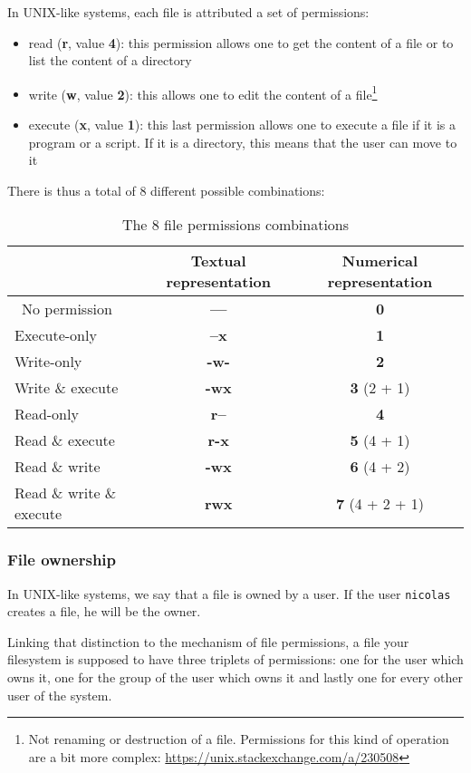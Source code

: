 \documentclass[12pt]{article}
\begin{document}
In UNIX-like systems, each file is attributed a set of permissions:
\begin{itemize}
	\item read (\textbf{r}, value \textbf{4}): this permission allows one to get the content of a file or to list the content of a directory
	\item write (\textbf{w}, value \textbf{2}): this allows one to edit the content of a file\footnote{Not renaming or destruction of a file. Permissions for this kind of operation are a bit more complex: \url{https://unix.stackexchange.com/a/230508}}
	\item execute (\textbf{x}, value \textbf{1}): this last permission allows one to execute a file if it is a program or a script. If it is a directory, this means that the user can move to it
\end{itemize}

There is thus a total of 8 different possible combinations:
 
\begin{table}[ht]
\centering
\begin{tabular}[t]{lcc}
\toprule
&Textual representation &Numerical representation\\
\midrule\
No permission&\textbf{---}&\textbf{0}\\
Execute-only&\textbf{--x}&\textbf{1}\\
Write-only&\textbf{-w-}&\textbf{2}\\
Write \& execute&\textbf{-wx}&\textbf{3} (2 + 1)\\
Read-only&\textbf{r--}&\textbf{4}\\
Read \& execute&\textbf{r-x}&\textbf{5} (4 + 1)\\
Read \& write&\textbf{-wx}&\textbf{6} (4 + 2)\\
Read \& write \& execute&\textbf{rwx}&\textbf{7} (4 + 2 + 1)\\
\bottomrule
\end{tabular}
\caption{The 8 file permissions combinations}
\end{table}%

\subsubsection{File ownership}

In UNIX-like systems, we say that a file is owned by a user. If the user \texttt{nicolas} creates a file, he will be the owner.

Linking that distinction to the mechanism of file permissions, a file your filesystem is supposed to have three triplets of permissions: one for the user which owns it, one for the group of the user which owns it and lastly one for every other user of the system.
\end{document}
